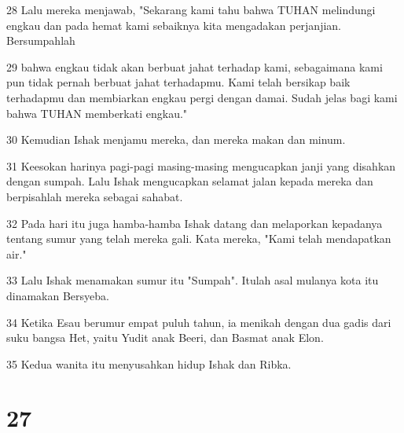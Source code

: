 \par 28 Lalu mereka menjawab, "Sekarang kami tahu bahwa TUHAN melindungi engkau dan pada hemat kami sebaiknya kita mengadakan perjanjian. Bersumpahlah
\par 29 bahwa engkau tidak akan berbuat jahat terhadap kami, sebagaimana kami pun tidak pernah berbuat jahat terhadapmu. Kami telah bersikap baik terhadapmu dan membiarkan engkau pergi dengan damai. Sudah jelas bagi kami bahwa TUHAN memberkati engkau."
\par 30 Kemudian Ishak menjamu mereka, dan mereka makan dan minum.
\par 31 Keesokan harinya pagi-pagi masing-masing mengucapkan janji yang disahkan dengan sumpah. Lalu Ishak mengucapkan selamat jalan kepada mereka dan berpisahlah mereka sebagai sahabat.
\par 32 Pada hari itu juga hamba-hamba Ishak datang dan melaporkan kepadanya tentang sumur yang telah mereka gali. Kata mereka, "Kami telah mendapatkan air."
\par 33 Lalu Ishak menamakan sumur itu "Sumpah". Itulah asal mulanya kota itu dinamakan Bersyeba.
\par 34 Ketika Esau berumur empat puluh tahun, ia menikah dengan dua gadis dari suku bangsa Het, yaitu Yudit anak Beeri, dan Basmat anak Elon.
\par 35 Kedua wanita itu menyusahkan hidup Ishak dan Ribka.

\chapter{27}

